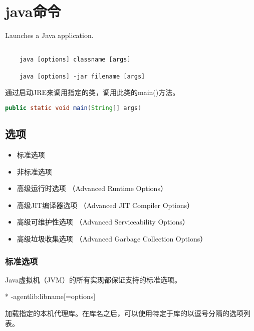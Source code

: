 \section{java命令}
\label{chap:tools_java}

Launches a Java application.

\begin{lstlisting}[language=cshell]

    java [options] classname [args]

    java [options] -jar filename [args]

\end{lstlisting}

通过启动JRE来调用指定的类，调用此类的main()方法。
\begin{lstlisting}[language=Java]
    public static void main(String[] args)
\end{lstlisting}

\subsection{选项} 


\begin{itemize}
    \item   标准选项
    \item   非标准选项 
    \item   高级运行时选项      （Advanced Runtime Options）
    \item   高级JIT编译器选项   （Advanced JIT Compiler Options）
    \item   高级可维护性选项    （Advanced Serviceability Options）
    \item   高级垃圾收集选项    （Advanced Garbage Collection Options）
\end{itemize}



\subsubsection{标准选项} 

Java虚拟机（JVM）的所有实现都保证支持的标准选项。


* -agentlib:libname[=options]

加载指定的本机代理库。在库名之后，可以使用特定于库的以逗号分隔的选项列表。






